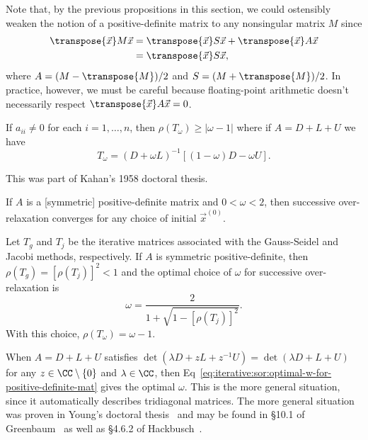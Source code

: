 \begin{rmk}
Note that, by the previous propositions in this section, we could
ostensibly weaken the notion of a positive-definite matrix to any
nonsingular matrix $M$ since
\begin{equation}
  \begin{split}
\transpose{\vec{x}}M\vec{x}&=\transpose{\vec{x}}S\vec{x}+\transpose{\vec{x}}A\vec{x}\\
&=\transpose{\vec{x}}S\vec{x},
  \end{split}
\end{equation}
where $A=(M-\transpose{M})/2$ and $S=(M+\transpose{M})/2$.
In practice, however, we must be careful because floating-point arithmetic
doesn't necessarily respect $\transpose{\vec{x}}A\vec{x}=0$.
\end{rmk}

\begin{theorem}[Kahan]
If $a_{ii}\neq0$ for each $i=1,\dots,n$, then
$\rho(T_{\omega})\geq|\omega-1|$ where if $A=D+L+U$ we have
\[ T_{\omega} = (D+\omega L)^{-1}[(1-\omega)D-\omega U]. \]
\end{theorem}

This was part of Kahan's 1958 doctoral thesis.

\begin{theorem}
If $A$ is a [symmetric] positive-definite matrix and $0<\omega<2$, then
successive over-relaxation converges for any choice of initial $\vec{x}^{(0)}$.
\end{theorem}

\begin{theorem}
Let $T_{g}$ and $T_{j}$ be the iterative matrices associated with the
Gauss-Seidel and Jacobi methods, respectively. If $A$ is symmetric
positive-definite, then $\rho(T_{g})=[\rho(T_{j})]^{2}<1$ and the
optimal choice of $\omega$ for successive over-relaxation is
\begin{equation}\label{eq:iterative:sor:optimal-w-for-positive-definite-mat}
\omega = \frac{2}{1 + \sqrt{1 - [\rho(T_{j})]^{2}}}.
\end{equation}
With this choice, $\rho(T_{\omega})=\omega-1$.
\end{theorem}

\begin{rmk}
When $A=D+L+U$ satisfies $\det(\lambda D+zL+z^{-1}U)=\det(\lambda D+L+U)$
for any $z\in\CC\setminus\{0\}$ and $\lambda\in\CC$, then Eq~\eqref{eq:iterative:sor:optimal-w-for-positive-definite-mat}
gives the optimal $\omega$. This is the more general situation, since it
automatically describes tridiagonal matrices. The more general situation
was proven in Young's doctoral thesis~\cite{young1950} and may be found
in \S10.1 of Greenbaum~\cite{greenbaum1997iterative} as well as \S4.6.2 of Hackbusch~\cite{hackbusch2016iterative}.
\end{rmk}

